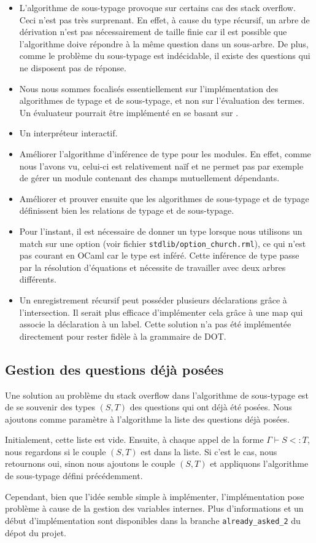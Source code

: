 \begin{itemize}
  \item L'algorithme de sous-typage provoque sur certains cas des stack
    overflow. Ceci n'est pas très surprenant. En effet, à cause
    du type récursif, un arbre de dérivation n'est pas nécessairement de taille finie car
    il est possible que l'algorithme doive répondre à la même question dans un
    sous-arbre. De plus, comme le problème du sous-typage est indécidable, il
    existe des questions qui ne disposent pas de réponse.
  \item Nous nous sommes focalisés essentiellement sur l'implémentation des
    algorithmes de typage et de sous-typage, et non sur l'évaluation des termes.
    Un évaluateur pourrait être implémenté en se basant sur \cite{WF-DOT-2016}.
  \item Un interpréteur interactif.
  \item Améliorer l'algorithme d'inférence de type pour les modules. En effet,
      comme nous l'avons vu, celui-ci est relativement naïf et ne permet pas par
      exemple de gérer un module contenant des champs mutuellement dépendants.
  \item Améliorer et prouver ensuite que les algorithmes de sous-typage et de
      typage définissent bien les relations de typage et de sous-typage.
  \item Pour l'instant, il est nécessaire de donner un type lorsque nous
    utilisons un match sur une option (voir fichier \verb|stdlib/option_church.rml|), ce qui
    n'est pas courant en OCaml car le type est inféré. Cette inférence de type
    passe par la résolution d'équations et nécessite de travailler avec deux
    arbres différents.
  \item Un enregistrement récursif peut posséder plusieurs déclarations grâce à
    l'intersection. Il serait plus efficace d'implémenter cela grâce à une map
    qui associe la déclaration à un label. Cette solution n'a pas été
    implémentée directement pour rester fidèle à la grammaire de DOT.
\end{itemize}


\subsection*{Gestion des questions déjà posées}

Une solution au problème du stack overflow dans l'algorithme de sous-typage est
de se souvenir des types $(S, T)$ des questions qui ont déjà été posées. Nous
ajoutons comme paramètre à l'algorithme la liste des questions déjà posées.

Initialement, cette liste est vide. Ensuite, à chaque appel de la forme $\Gamma
\vdash S <: T$, nous regardons si le couple $(S, T)$ est dans la liste. Si c'est
le cas, nous retournons oui, sinon nous ajoutons le couple $(S, T)$ et
appliquons l'algorithme de sous-typage défini précédemment.

Cependant, bien que l'idée semble simple à implémenter, l'implémentation pose
problème à cause de la gestion des variables internes.
Plus d'informations et un début d'implémentation sont disponibles dans la
branche \verb|already_asked_2| du dépot du projet.


